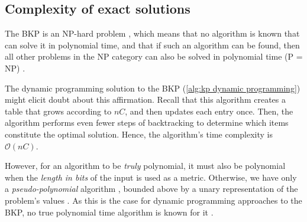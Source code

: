 \subsection{Complexity of exact solutions}

The BKP is an NP-hard problem \cite{PISINGER2005}, which means that no algorithm is known that can solve it in polynomial time, and that if such an algorithm can be found, then all other problems in the NP category can also be solved in polynomial time (P = NP) \cite{ERICKSON2019}.

The dynamic programming solution to the BKP (\cref{alg:kp dynamic programming}) might elicit doubt about this affirmation. Recall that this algorithm creates a table that grows according to $nC$, and then updates each entry once. Then, the algorithm performs even fewer steps of backtracking to determine which items constitute the optimal solution. Hence, the algorithm's time complexity is $\mathcal{O}(nC)$.

However, for an algorithm to be \emph{truly} polynomial, it must also be polynomial when the \emph{length in bits} of the input is used as a metric. Otherwise, we have only a \emph{pseudo-polynomial} algorithm \cite{WENDLAND}, bounded above by a unary representation of the problem's values \cite{ERICKSON2019,VAZIRANI2001}. As this is the case for dynamic programming approaches to the BKP, no true polynomial time algorithm is known for it \cite{DUDLEY2016,PISINGER2005}.

